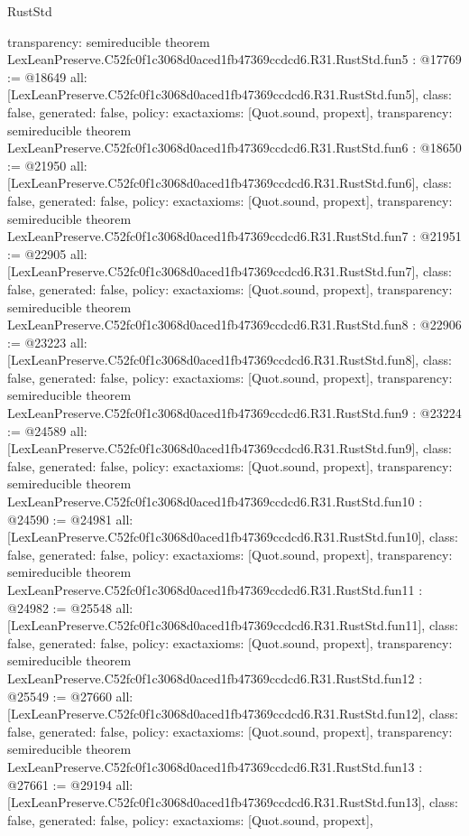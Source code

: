 \begin{lexlean}{RustStd}
\begin{coremodule}
{  transparency: semireducible
}
theorem LexLeanPreserve.C52fc0f1c3068d0aced1fb47369ccdcd6.R31.RustStd.fun5 : @17769 := @18649 {
  all: [LexLeanPreserve.C52fc0f1c3068d0aced1fb47369ccdcd6.R31.RustStd.fun5],
  class: false,
  generated: false,
  policy: exact{axioms: [Quot.sound, propext]},
  transparency: semireducible
}
theorem LexLeanPreserve.C52fc0f1c3068d0aced1fb47369ccdcd6.R31.RustStd.fun6 : @18650 := @21950 {
  all: [LexLeanPreserve.C52fc0f1c3068d0aced1fb47369ccdcd6.R31.RustStd.fun6],
  class: false,
  generated: false,
  policy: exact{axioms: [Quot.sound, propext]},
  transparency: semireducible
}
theorem LexLeanPreserve.C52fc0f1c3068d0aced1fb47369ccdcd6.R31.RustStd.fun7 : @21951 := @22905 {
  all: [LexLeanPreserve.C52fc0f1c3068d0aced1fb47369ccdcd6.R31.RustStd.fun7],
  class: false,
  generated: false,
  policy: exact{axioms: [Quot.sound, propext]},
  transparency: semireducible
}
theorem LexLeanPreserve.C52fc0f1c3068d0aced1fb47369ccdcd6.R31.RustStd.fun8 : @22906 := @23223 {
  all: [LexLeanPreserve.C52fc0f1c3068d0aced1fb47369ccdcd6.R31.RustStd.fun8],
  class: false,
  generated: false,
  policy: exact{axioms: [Quot.sound, propext]},
  transparency: semireducible
}
theorem LexLeanPreserve.C52fc0f1c3068d0aced1fb47369ccdcd6.R31.RustStd.fun9 : @23224 := @24589 {
  all: [LexLeanPreserve.C52fc0f1c3068d0aced1fb47369ccdcd6.R31.RustStd.fun9],
  class: false,
  generated: false,
  policy: exact{axioms: [Quot.sound, propext]},
  transparency: semireducible
}
theorem LexLeanPreserve.C52fc0f1c3068d0aced1fb47369ccdcd6.R31.RustStd.fun10 : @24590 := @24981 {
  all: [LexLeanPreserve.C52fc0f1c3068d0aced1fb47369ccdcd6.R31.RustStd.fun10],
  class: false,
  generated: false,
  policy: exact{axioms: [Quot.sound, propext]},
  transparency: semireducible
}
theorem LexLeanPreserve.C52fc0f1c3068d0aced1fb47369ccdcd6.R31.RustStd.fun11 : @24982 := @25548 {
  all: [LexLeanPreserve.C52fc0f1c3068d0aced1fb47369ccdcd6.R31.RustStd.fun11],
  class: false,
  generated: false,
  policy: exact{axioms: [Quot.sound, propext]},
  transparency: semireducible
}
theorem LexLeanPreserve.C52fc0f1c3068d0aced1fb47369ccdcd6.R31.RustStd.fun12 : @25549 := @27660 {
  all: [LexLeanPreserve.C52fc0f1c3068d0aced1fb47369ccdcd6.R31.RustStd.fun12],
  class: false,
  generated: false,
  policy: exact{axioms: [Quot.sound, propext]},
  transparency: semireducible
}
theorem LexLeanPreserve.C52fc0f1c3068d0aced1fb47369ccdcd6.R31.RustStd.fun13 : @27661 := @29194 {
  all: [LexLeanPreserve.C52fc0f1c3068d0aced1fb47369ccdcd6.R31.RustStd.fun13],
  class: false,
  generated: false,
  policy: exact{axioms: [Quot.sound, propext]},
}
\end{coremodule}
\end{lexlean}
